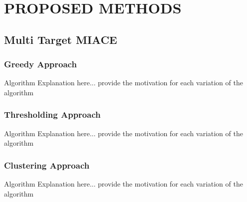\chapter{PROPOSED METHODS} \label{methods}

\section{Multi Target MIACE}

\subsection{Greedy Approach}
Algorithm Explanation here... provide the motivation for each variation of the algorithm

\subsection{Thresholding Approach}
Algorithm Explanation here... provide the motivation for each variation of the algorithm

\subsection{Clustering Approach}
Algorithm Explanation here... provide the motivation for each variation of the algorithm